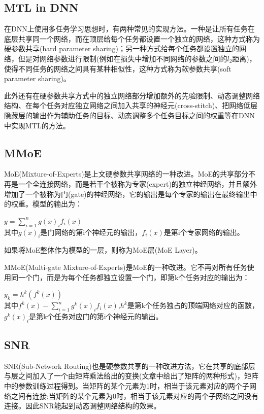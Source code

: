 \documentclass[]{article}
\begin{document}
\subsection{MTL in DNN}
在DNN上使用多任务学习思想时，有两种常见的实现方法\cite{Ruder2017}。一种是让所有任务在底层共享同一个网络，而在顶层给每个任务都设置一个独立的网络，这种方式称为硬参数共享(hard parameter sharing)；另一种方式给每个任务都设置独立的网络，但是对网络参数进行限制(例如在损失中增加不同网络的参数之间的$l_2$距离)，使得不同任务的网络之间具有某种相似性，这种方式称为软参数共享(soft parameter sharing)。

此外还有在硬参数共享方式中的独立网络部分增加额外的先验限制、动态调整网络结构、在每个任务对应独立网络之间加入共享的神经元(cross-stitch)、把网络低层隐藏层的输出作为辅助任务的目标、动态调整多个任务目标之间的权重等在DNN中实现MTL的方法。

\subsection{MMoE}
MoE(Mixture-of-Experts)是上文硬参数共享网络的一种改进。MoE的共享部分不再是一个全连接网络，而是若干个被称为专家(expert)的独立神经网络，并且额外增加了一个被称为门(gate)的神经网络，它的输出是每个专家的输出在最终输出中的权重。模型的输出为：

$y=\sum_{i=1}^{n}g(x)_if_i(x)$
~\\
其中$g(x)_i$是门网络的第i个神经元的输出，$f_i(x)$是第i个专家网络的输出。

如果将MoE整体作为模型的一层，则称为MoE层(MoE Layer)。

MMoE(Multi-gate Mixture-of-Experts)\cite{Ma2018}是MoE的一种改进。它不再对所有任务使用同一个门，而是为每个任务都独立设置一个门，即第k个任务对应的输出为：

$y_k=h^k(f^k(x))$
~\\
其中$f^k(x)-\sum_{i=1}^{n}g^k(x)_if_i(x)$,$h^k$是第k个任务独占的顶端网络对应的函数，$g^k(x)_i$是第k个任务对应门的第i个神经元的输出。

\subsection{SNR}
SNR(Sub-Network Routing)\cite{Ma2019}也是硬参数共享的一种改进方法，它在共享的底部层与层之间加入了一个由矩阵乘法给出的变换(文章中给出了矩阵的两种形式)，矩阵中的参数训练过程得到。当矩阵的某个元素为1时，相当于该元素对应的两个子网络之间有连接;当矩阵的某个元素为0时，相当于该元素对应的两个子网络之间没有连接。因此SNR能起到动态调整网络结构的效果。
\end{document}
